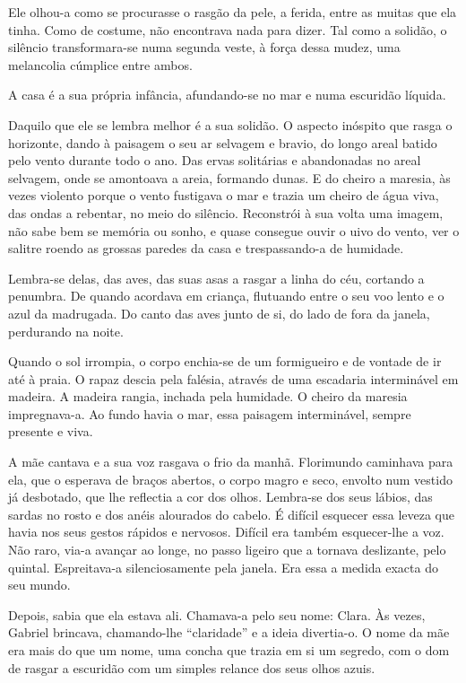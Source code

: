 Ele olhou-a como se procurasse o rasgão da pele, a ferida, entre as
muitas que ela tinha. Como de costume, não encontrava nada para dizer.
Tal como a solidão, o silêncio transformara-se numa segunda veste, à
força dessa mudez, uma melancolia cúmplice entre ambos.

A casa é a sua própria infância, afundando-se no mar e numa escuridão
líquida.

Daquilo que ele se lembra melhor é a sua solidão. O aspecto inóspito que
rasga o horizonte, dando à paisagem o seu ar selvagem e bravio, do longo
areal batido pelo vento durante todo o ano. Das ervas solitárias e
abandonadas no areal selvagem, onde se amontoava a areia, formando
dunas. E do cheiro a maresia, às vezes violento porque o vento fustigava
o mar e trazia um cheiro de água viva, das ondas a rebentar, no meio do
silêncio. Reconstrói à sua volta uma imagem, não sabe bem se memória ou
sonho, e quase consegue ouvir o uivo do vento, ver o salitre roendo as
grossas paredes da casa e trespassando-a de humidade.

Lembra-se delas, das aves, das suas asas a rasgar a linha do céu,
cortando a penumbra. De quando acordava em criança, flutuando entre o
seu voo lento e o azul da madrugada. Do canto das aves junto de si, do
lado de fora da janela, perdurando na noite.

Quando o sol irrompia, o corpo enchia-se de um formigueiro e de vontade
de ir até à praia. O rapaz descia pela falésia, através de uma escadaria
interminável em madeira. A madeira rangia, inchada pela humidade. O
cheiro da maresia impregnava-a. Ao fundo havia o mar, essa paisagem
interminável, sempre presente e viva.

A mãe cantava e a sua voz rasgava o frio da manhã. Florimundo caminhava
para ela, que o esperava de braços abertos, o corpo magro e seco,
envolto num vestido já desbotado, que lhe reflectia a cor dos olhos.
Lembra-se dos seus lábios, das sardas no rosto e dos anéis alourados do
cabelo. É difícil esquecer essa leveza que havia nos seus gestos rápidos
e nervosos. Difícil era também esquecer-lhe a voz. Não raro, via-a
avançar ao longe, no passo ligeiro que a tornava deslizante, pelo
quintal. Espreitava-a silenciosamente pela janela. Era essa a medida
exacta do seu mundo.

Depois, sabia que ela estava ali. Chamava-a pelo seu nome: Clara. Às
vezes, Gabriel brincava, chamando-lhe ``claridade'' e a ideia
divertia-o. O nome da mãe era mais do que um nome, uma concha que trazia
em si um segredo, com o dom de rasgar a escuridão com um simples relance
dos seus olhos azuis.

